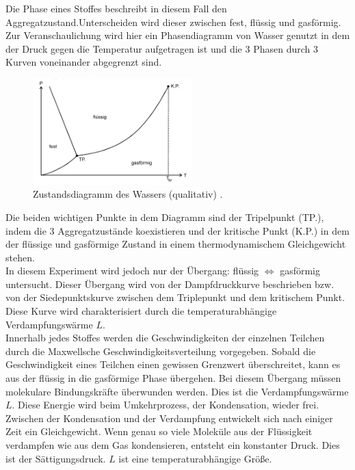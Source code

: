 Die \glqq Phase\grqq{} eines Stoffes beschreibt in diesem Fall den Aggregatzustand.Unterscheiden wird dieser zwischen fest, 
flüssig und gasförmig. 
Zur Veranschaulichung wird hier ein Phasendiagramm von Wasser genutzt in dem der Druck gegen die Temperatur aufgetragen ist und die 3 
\glqq Phasen\grqq{} durch 3 Kurven voneinander abgegrenzt sind.\\
\begin{figure}[H]
    \centering
    \includegraphics[width=0.55\textwidth]{images/Diagramm.PNG}
    \caption{Zustandsdiagramm des Wassers (qualitativ) \protect \cite{V203}.}
    \label{img:Zustand}
\end{figure}
\noindent Die beiden wichtigen Punkte in dem Diagramm sind der Tripelpunkt (TP.), indem die 
3 Aggregatzustände koexistieren und der kritische Punkt (K.P.) in dem der flüssige und gasförmige Zustand in einem 
thermodynamischem Gleichgewicht stehen.\\
In diesem Experiment wird jedoch nur der Übergang: flüssig $\Leftrightarrow$ gasförmig untersucht. 
Dieser Übergang wird von der Dampfdruckkurve beschrieben bzw. von der Siedepunktskurve zwischen dem Triplepunkt und dem kritischem Punkt.
Diese Kurve wird charakterisiert durch die temperaturabhängige Verdampfungswärme $L$. \\
\noindent
Innerhalb jedes Stoffes werden die Geschwindigkeiten der einzelnen Teilchen
durch die Maxwellsche Geschwindigkeitsverteilung vorgegeben. Sobald die Geschwindigkeit eines Teilchen einen gewissen Grenzwert 
überschreitet, kann es aus der flüssig in die gasförmige Phase übergehen. Bei diesem Übergang müssen molekulare Bindungskräfte überwunden
werden. Dies ist die Verdampfungswärme $L$. Diese Energie wird beim Umkehrprozess, der Kondensation, wieder frei.\\
Zwischen der Kondensation und der Verdampfung entwickelt sich nach einiger Zeit ein Gleichgewicht.
Wenn genau so viele Moleküle aus der Flüssigkeit verdampfen wie aus dem Gas kondensieren, entsteht ein konstanter Druck.
Dies ist der Sättigungsdruck. $L$ ist eine temperaturabhängige Größe.
